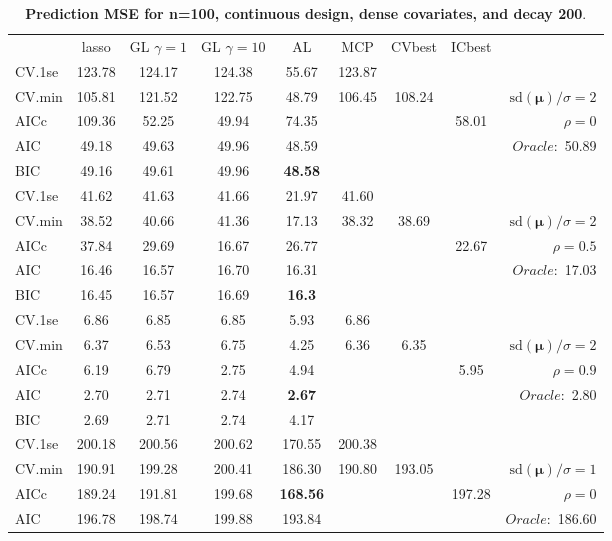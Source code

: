\clearpage
\begin{table}\vspace{-.5cm}
\caption[l]{ { \bf Prediction MSE for n=100, continuous design, 
dense covariates, and  decay  200}.}
\vspace{-.5cm}
\footnotesize{}
\begin{center}
\begin{tabular}{l*{7}{c}|r}
 & lasso & GL $\gamma=1$ & GL $\gamma=10$ & AL & MCP  & CVbest & ICbest  \\
\cline{1-9}
CV.1se & 123.78 & 124.17 & 124.38 & 55.67 & 123.87 & & & \\
CV.min & 105.81 & 121.52 & 122.75 & 48.79 & 106.45 & 108.24 & & $\mathrm{sd}(\mathbf{\mu})/\sigma=2$ \\
AICc & 109.36 & 52.25 & 49.94 & 74.35 & & & 58.01 &  $\rho=0$ \\
AIC & 49.18 & 49.63 & 49.96 & 48.59 & & & &  \multirow{2}{*}{$Oracle: $ 50.89} \\
BIC & 49.16 & 49.61 & 49.96 & {\bf 48.58} & & & &  \\
 \hline 
CV.1se & 41.62 & 41.63 & 41.66 & 21.97 & 41.60 & & & \\
CV.min & 38.52 & 40.66 & 41.36 & 17.13 & 38.32 & 38.69 & & $\mathrm{sd}(\mathbf{\mu})/\sigma=2$ \\
AICc & 37.84 & 29.69 & 16.67 & 26.77 & & & 22.67 &  $\rho=0.5$ \\
AIC & 16.46 & 16.57 & 16.70 & 16.31 & & & &  \multirow{2}{*}{$Oracle: $ 17.03} \\
BIC & 16.45 & 16.57 & 16.69 & {\bf 16.3} & & & &  \\
 \hline 
CV.1se & 6.86 & 6.85 & 6.85 & 5.93 & 6.86 & & & \\
CV.min & 6.37 & 6.53 & 6.75 & 4.25 & 6.36 & 6.35 & & $\mathrm{sd}(\mathbf{\mu})/\sigma=2$ \\
AICc & 6.19 & 6.79 & 2.75 & 4.94 & & & 5.95 &  $\rho=0.9$ \\
AIC & 2.70 & 2.71 & 2.74 & {\bf 2.67} & & & &  \multirow{2}{*}{$Oracle: $ 2.80} \\
BIC & 2.69 & 2.71 & 2.74 & 4.17 & & & &  \\
 \hline 
CV.1se & 200.18 & 200.56 & 200.62 & 170.55 & 200.38 & & & \\
CV.min & 190.91 & 199.28 & 200.41 & 186.30 & 190.80 & 193.05 & & $\mathrm{sd}(\mathbf{\mu})/\sigma=1$ \\
AICc & 189.24 & 191.81 & 199.68 & {\bf 168.56} & & & 197.28 &  $\rho=0$ \\
AIC & 196.78 & 198.74 & 199.88 & 193.84 & & & &  \multirow{2}{*}{$Oracle: $ 186.60} \\

\end{tabular}
\end{center}
\end{table}
